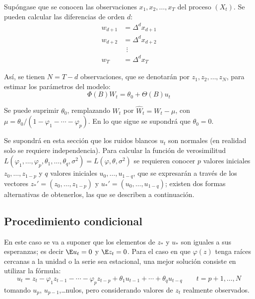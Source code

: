 Sup\'{o}ngase que se conocen las observaciones $x_{1}, x_{2},\ldots ,x_{T}$ del proceso $(X_{t})$. Se pueden calcular las diferencias de orden $d$:
\begin{align*}
 w_{d+1}&=\Delta^{d}x_{d+1}\\
 w_{d+2}&=\Delta^{d}x_{d+2}\\
 &\ \ \vdots \\
 w_{T}&=\Delta^{d}x_{T}
\end{align*}

As\'{i}, se tienen $N=T- d$ observaciones, que se denotar\'{a}n por $z_{1} ,z_{2} ,\ldots,z_{N} $, para estimar los par\'{a}metros del modelo:
\[
\Phi (B) W_{t} = \theta_{0} + \Theta (B)u_{t} 
\]

Se puede suprimir $\theta_{0}$, remplazando $W_{t}$ por $\widehat W_{t} =W_{t} -\mu$, con $\mu =\theta_{0}/\left( {1-\varphi_{1} -\cdots -\varphi_{p} } \right)$. En lo que sigue se supondr\'{a} que $\theta_{0}= 0$.\newline

Se supondr\'{a} en esta secci\'{o}n que los ruidos blancos $u_{t} $ son normales (en realidad solo se requiere independencia). Para calcular la funci\'{o}n de verosimilitud $L\left( {\varphi_{1} ,\ldots, \varphi_{p} ,\theta_{1} ,\ldots, \theta_{q} ,\sigma^{2}} \right)=L\left( {\varphi ,\theta ,\sigma^{2}} \right)$ se requieren conocer $p$ valores iniciales $z_{0} ,\ldots,z_{1-p} $ y $q$ valores iniciales $u_{0}, \ldots, u_{1-q}$, que se expresar\'{a}n a trav\'{e}s de los vectores $z_{\ast }' =\left( {z_{0} ,\ldots, z_{1-p} } \right)$ y $u_{\ast }' =\left( {u_{0} ,\ldots,u_{1-q} } \right)$; existen dos formas alternativas de obtenerlos, las que se describen a continuaci\'{o}n.

\subsection{Procedimiento condicional}

En este caso se va a suponer que los elementos de $z_{\ast }$ y $u_{\ast } $ son iguales a sus esperanzas; es decir $\E u_{t} =0$ y $\E z_{t} =0$. Para el caso en que $\varphi \left( z \right)$ tenga ra\'{i}ces cercanas a la unidad o la serie sea estacional, una mejor soluci\'{o}n consiste en utilizar la f\'{o}rmula:
\[
u_{t} =z_{t} -\varphi_{1} z_{t-1} -\cdots -\varphi_{p} z_{t-p} 
+\theta_{1} u_{t-1} +\cdots +\theta_{q} u_{t-q} \qquad t=p+1,\ldots ,N
\]
tomando $u_{p} $, $u_{p-1}$,\dots nulos, pero considerando valores de $z_{t} $ realmente observados.\newline


